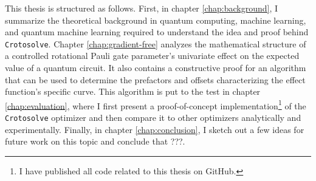 This thesis is structured as follows.
First, in chapter \ref{chap:background}, I summarize the theoretical background
in quantum computing, machine learning, and quantum machine learning required to
understand the idea and proof behind \texttt{Crotosolve}.
Chapter \ref{chap:gradient-free} analyzes the mathematical structure of a
controlled rotational Pauli gate parameter's univariate effect on the
expected value of a quantum circuit.
It also contains a constructive proof for an algorithm that can be used to
determine the prefactors and offsets characterizing the effect function's
specific curve.
This algorithm is put to the test in chapter \ref{chap:evaluation}, where I
first present a proof-of-concept implementation\footnote{I have published all
code related to this thesis on GitHub.} of the \texttt{Crotosolve} optimizer
and then compare it to other optimizers analytically and experimentally.
Finally, in chapter \ref{chap:conclusion}, I sketch out a few ideas for future
work on this topic and conclude that ???.

